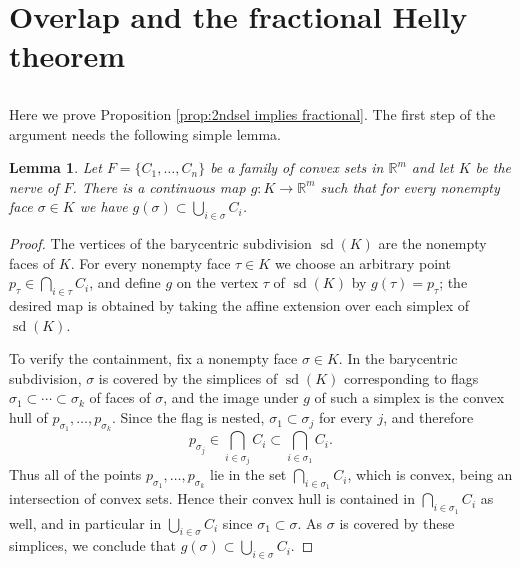 \documentclass[12pt,a4paper,oneside]{amsart}\sloppy
\newtheorem{lemma}[theorem]{Lemma}
\theoremstyle{definition}
\DeclareMathOperator{\bary}{sd}
\begin{document}
\section{Overlap and the fractional Helly theorem}\label{sec:fractional}

\subsection{} Here we prove Proposition \ref{prop:2ndsel implies fractional}. The first step of the argument needs the following simple lemma.

\begin{lemma}\label{lem:K in F}
Let $F = \{C_1, \dots, C_n\}$ be a family of convex sets in $\mathbb{R}^m$ and let $K$ be the nerve of $F$. There is a continuous map $g: K \to \mathbb{R}^m$ such that for every nonempty face $\sigma\in K$ we have $g(\sigma)\subset \bigcup_{i\in \sigma}C_i$.
\end{lemma}

\begin{proof}
The vertices of the barycentric subdivision $\bary(K)$ are the nonempty faces of $K$. For every nonempty face $\tau\in K$ we choose an arbitrary point $p_{\tau} \in \bigcap_{i\in \tau} C_i$, and define $g$ on the vertex $\tau$ of $\bary(K)$ by $g(\tau) = p_\tau$; the desired map is obtained by taking the affine extension over each simplex of $\bary(K)$.

To verify the containment, fix a nonempty face $\sigma\in K$. In the barycentric subdivision, $\sigma$ is covered by the simplices of $\bary(K)$ corresponding to flags $\sigma_1 \subset \cdots \subset \sigma_k$ of faces of $\sigma$, and the image under $g$ of such a simplex is the convex hull of $p_{\sigma_1}, \dots, p_{\sigma_k}$. Since the flag is nested, $\sigma_1 \subset \sigma_j$ for every $j$, and therefore
\[p_{\sigma_j} \in \bigcap_{i\in \sigma_j} C_i \subset \bigcap_{i\in \sigma_1} C_i.\]
Thus all of the points $p_{\sigma_1}, \dots, p_{\sigma_k}$ lie in the set $\bigcap_{i\in \sigma_1} C_i$, which is convex, being an intersection of convex sets. Hence their convex hull is contained in $\bigcap_{i\in \sigma_1} C_i$ as well, and in particular in $\bigcup_{i\in \sigma}C_i$ since $\sigma_1 \subset \sigma$. As $\sigma$ is covered by these simplices, we conclude that $g(\sigma)\subset \bigcup_{i\in\sigma}C_i$.
\end{proof}
\end{document}
